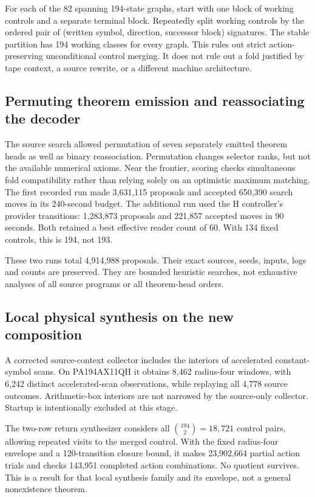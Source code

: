 \documentclass[11pt,letterpaper]{article}
\theoremstyle{definition}\newtheorem{definition}[theorem]{Definition}
\theoremstyle{remark}\newtheorem{remark}[theorem]{Remark}
\begin{document}
For each of the 82 spanning 194-state graphs, start with one block of
working controls and a separate terminal block. Repeatedly split working
controls by the ordered pair of (written symbol, direction, successor
block) signatures. The stable partition has 194 working classes for every
graph. This rules out strict action-preserving unconditional control
merging. It does not rule out a fold justified by tape context, a source
rewrite, or a different machine architecture.

\subsection{Permuting theorem emission and reassociating the decoder}

The source search allowed permutation of seven separately emitted theorem
heads as well as binary reassociation. Permutation changes selector ranks,
but not the available numerical axioms. Near the frontier, scoring checks
simultaneous fold compatibility rather than relying solely on an optimistic
maximum matching. The first recorded run made 3,631,115 proposals and
accepted 650,390 search moves in its 240-second budget. The additional run
used the H controller's provider transitions: 1,283,873 proposals and
221,857 accepted moves in 90 seconds. Both retained a best effective reader
count of 60. With 134 fixed controls, this is 194, not 193.

These two runs total 4,914,988 proposals. Their exact sources, seeds,
inputs, logs and counts are preserved. They are bounded heuristic searches,
not exhaustive analyses of all source programs or all theorem-head orders.

\subsection{Local physical synthesis on the new composition}

A corrected source-context collector includes the interiors of accelerated
constant-symbol scans. On PA194AX11QH it obtains 8,462 radius-four windows,
with 6,242 distinct accelerated-scan observations, while replaying all
4,778 source outcomes. Arithmetic-box interiors are not narrowed by the
source-only collector. Startup is intentionally excluded at this stage.

The two-row return synthesizer considers all $\binom{194}{2}=18,721$
control pairs, allowing repeated visits to the merged control. With the
fixed radius-four envelope and a 120-transition closure bound, it makes
23,902,664 partial action trials and checks 143,951 completed action
combinations. No quotient survives. This is a result for that local
synthesis family and its envelope, not a general nonexistence theorem.
\end{document}
